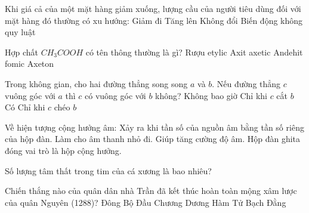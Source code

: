 \begin{ex}
    Khi giá cả của một mặt hàng giảm xuống, lượng cầu của người tiêu dùng đối với mặt hàng đó thường có xu hướng:
    \choice
    {Giảm đi}
    {\True Tăng lên}
    {Không đổi}
    {Biến động không quy luật}
\end{ex}

\begin{ex}
    Hợp chất $CH_3COOH$ có tên thông thường là gì?
    \choice
    {Rượu etylic}
    {\True Axit axetic}
    {Andehit fomic}
    {Axeton}
\end{ex}

\begin{ex}
    Trong không gian, cho hai đường thẳng song song $a$ và $b$. Nếu đường thẳng $c$ vuông góc với $a$ thì $c$ có vuông góc với $b$ không?
    \choice
    {Không bao giờ}
    {Chỉ khi $c$ cắt $b$}
    {\True Có}
    {Chỉ khi $c$ chéo $b$}
\end{ex}

\begin{ex}
    Về hiện tượng cộng hưởng âm:
    \choiceTF
    {\True Xảy ra khi tần số của nguồn âm bằng tần số riêng của hộp đàn.}
    {Làm cho âm thanh nhỏ đi.}
    {\True Giúp tăng cường độ âm.}
    {\True Hộp đàn ghita đóng vai trò là hộp cộng hưởng.}
\end{ex}

\begin{ex}
    Số lượng tâm thất trong tim của cá xương là bao nhiêu?
\end{ex}

\begin{ex}
    Chiến thắng nào của quân dân nhà Trần đã kết thúc hoàn toàn mộng xâm lược của quân Nguyên (1288)?
    \choice
    {Đông Bộ Đầu}
    {Chương Dương}
    {Hàm Tử}
    {\True Bạch Đằng}
\end{ex}

